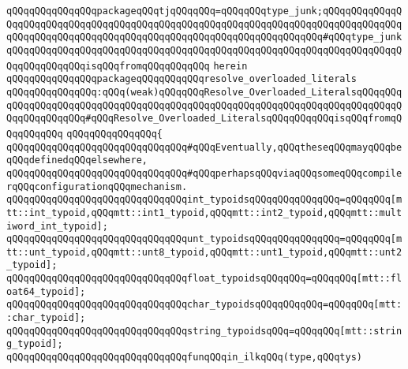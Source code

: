 \verb|qQQqqQQqqQQqqQQqpackageqQQqtjqQQqqQQq=qQQqqQQqtype_junk;qQQqqQQqqQQqqQQqqQQqqQQqqQQqqQQqqQQqqQQqqQQqqQQqqQQqqQQqqQQqqQQqqQQqqQQqqQQqqQQqqQQqqQQqqQQqqQQqqQQqqQQqqQQqqQQqqQQqqQQqqQQqqQQqqQQqqQQqqQQq#qQQqtype_junkqQQqqQQqqQQqqQQqqQQqqQQqqQQqqQQqqQQqqQQqqQQqqQQqqQQqqQQqqQQqqQQqqQQqqQQqqQQqqQQqqQQqisqQQqfromqQQqqQQqqQQq|\newline
\verb|herein|\newline
\newline
\newline
\verb|qQQqqQQqqQQqqQQqpackageqQQqqQQqqQQqresolve_overloaded_literals|\newline
\verb|qQQqqQQqqQQqqQQq:qQQq(weak)qQQqqQQqResolve_Overloaded_LiteralsqQQqqQQqqQQqqQQqqQQqqQQqqQQqqQQqqQQqqQQqqQQqqQQqqQQqqQQqqQQqqQQqqQQqqQQqqQQqqQQqqQQqqQQqqQQq#qQQqResolve_Overloaded_LiteralsqQQqqQQqqQQqisqQQqfromqQQqqQQqqQQq|\newline
\verb|qQQqqQQqqQQqqQQq{|\newline
\verb|qQQqqQQqqQQqqQQqqQQqqQQqqQQqqQQq#qQQqEventually,qQQqtheseqQQqmayqQQqbeqQQqdefinedqQQqelsewhere,|\newline
\verb|qQQqqQQqqQQqqQQqqQQqqQQqqQQqqQQq#qQQqperhapsqQQqviaqQQqsomeqQQqcompilerqQQqconfigurationqQQqmechanism.|\newline
\newline
\verb|qQQqqQQqqQQqqQQqqQQqqQQqqQQqqQQqint_typoidsqQQqqQQqqQQqqQQq=qQQqqQQq[mtt::int_typoid,qQQqmtt::int1_typoid,qQQqmtt::int2_typoid,qQQqmtt::multiword_int_typoid];|\newline
\verb|qQQqqQQqqQQqqQQqqQQqqQQqqQQqqQQqunt_typoidsqQQqqQQqqQQqqQQq=qQQqqQQq[mtt::unt_typoid,qQQqmtt::unt8_typoid,qQQqmtt::unt1_typoid,qQQqmtt::unt2_typoid];|\newline
\verb|qQQqqQQqqQQqqQQqqQQqqQQqqQQqqQQqfloat_typoidsqQQqqQQq=qQQqqQQq[mtt::float64_typoid];|\newline
\newline
\verb|qQQqqQQqqQQqqQQqqQQqqQQqqQQqqQQqchar_typoidsqQQqqQQqqQQq=qQQqqQQq[mtt::char_typoid];|\newline
\verb|qQQqqQQqqQQqqQQqqQQqqQQqqQQqqQQqstring_typoidsqQQq=qQQqqQQq[mtt::string_typoid];|\newline
\newline
\verb|qQQqqQQqqQQqqQQqqQQqqQQqqQQqqQQqfunqQQqin_ilkqQQq(type,qQQqtys)|\newline
